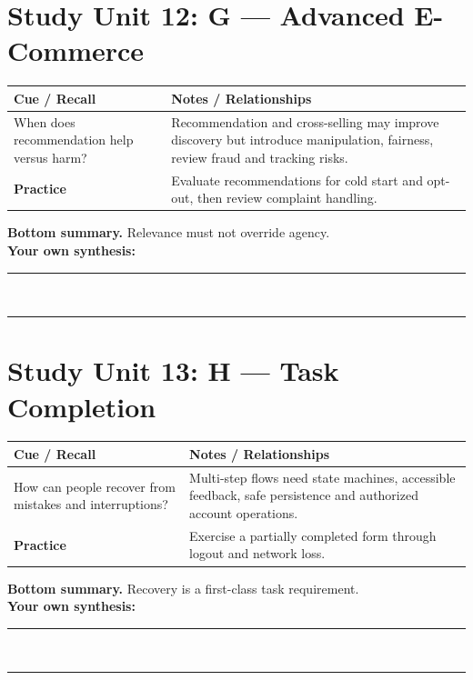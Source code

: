 \documentclass[11pt]{article}
\begin{document}
\section{Study Unit 12: G — Advanced E-Commerce}
\begin{longtable}{@{}p{.27\linewidth}p{.66\linewidth}@{}}\toprule
\textbf{Cue / Recall} & \textbf{Notes / Relationships}\\\midrule\endhead
When does recommendation help versus harm? & Recommendation and cross-selling may improve discovery but introduce manipulation, fairness, review fraud and tracking risks.\\
\addlinespace[4mm]
\textbf{Practice} & Evaluate recommendations for cold start and opt-out, then review complaint handling.\\\bottomrule\end{longtable}
\begin{dosnotebox}\textbf{Bottom summary.} Relevance must not override agency.\\[2mm]
\textbf{Your own synthesis:} \rule{.72\linewidth}{.4pt}\\[4mm]
\rule{.96\linewidth}{.4pt}\end{dosnotebox}

\section{Study Unit 13: H — Task Completion}
\begin{longtable}{@{}p{.27\linewidth}p{.66\linewidth}@{}}\toprule
\textbf{Cue / Recall} & \textbf{Notes / Relationships}\\\midrule\endhead
How can people recover from mistakes and interruptions? & Multi-step flows need state machines, accessible feedback, safe persistence and authorized account operations.\\
\addlinespace[4mm]
\textbf{Practice} & Exercise a partially completed form through logout and network loss.\\\bottomrule\end{longtable}
\begin{dosnotebox}\textbf{Bottom summary.} Recovery is a first-class task requirement.\\[2mm]
\textbf{Your own synthesis:} \rule{.72\linewidth}{.4pt}\\[4mm]
\rule{.96\linewidth}{.4pt}\end{dosnotebox}
\end{document}
